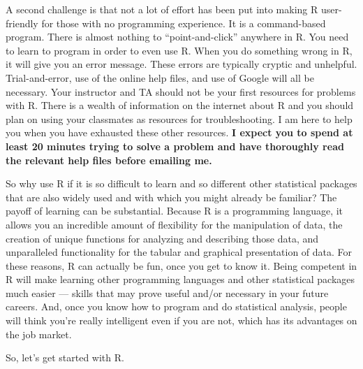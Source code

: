 \documentclass[12pt]{article}\usepackage[]{graphicx}\usepackage[]{color}
\begin{document}
A second challenge is that not a lot of effort has been put into making R user-friendly for those with no programming experience. It is a command-based program. There is almost nothing to ``point-and-click'' anywhere in R. You need to learn to program in order to even use R. When you do something wrong in R, it will give you an error message. These errors are typically cryptic and unhelpful. Trial-and-error, use of the online help files, and use of Google will all be necessary. Your instructor and TA should not be your first resources for problems with R. There is a wealth of information on the internet about R and you should plan on using your classmates as resources for troubleshooting. I am here to help you when you have exhausted these other resources. \textbf{I expect you to spend at least 20 minutes trying to solve a problem and have thoroughly read the relevant help files before emailing me.}

So why use R if it is so difficult to learn and so different other statistical packages that are also widely used and with which you might already be familiar? The payoff of learning can be substantial. Because R is a programming language, it allows you an incredible amount of flexibility for the manipulation of data, the creation of unique functions for analyzing and describing those data, and unparalleled functionality for the tabular and graphical presentation of data. For these reasons, R can actually be fun, once you get to know it. Being competent in R will make learning other programming languages and other statistical packages much easier --- skills that may prove useful and/or necessary in your future careers. And, once you know how to program and do statistical analysis, people will think you're really intelligent even if you are not, which has its advantages on the job market.

So, let's get started with R.
\end{document}
